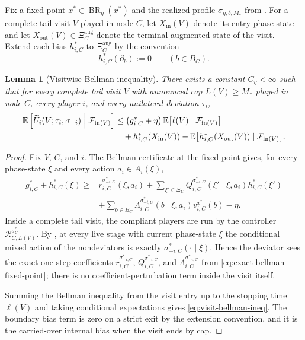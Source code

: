 \documentclass[12pt]{article}
\newtheorem{lemma}[theorem]{Lemma}
\theoremstyle{definition}
\newcommand{\E}{\mathbb{E}}
\newcommand{\1}{\mathbf{1}}
\newcommand{\cF}{\mathcal{F}}
\DeclareMathOperator{\BR}{BR}
\begin{document}
Fix a fixed point $x^*\in\BR_\eta(x^*)$ and the realized profile
$\sigma_{\eta,\delta,M_*}$ from . For a complete tail
visit $V$ played in node $C$, let $X_{\mathrm{in}}(V)$ denote its entry
phase-state and let $X_{\mathrm{out}}(V)\in\Xi_C^{\mathrm{aug}}$ denote the
terminal augmented state of the visit. Extend each bias $h_{i,C}^*$ to
$\Xi_C^{\mathrm{aug}}$ by the convention
\[
h_{i,C}^*(\partial_b):=0
\qquad (b\in B_C).
\]

\begin{lemma}[Visitwise Bellman inequality]
\label{lem:visit-bellman}
There exists a constant $C_\eta<\infty$ such that for every complete tail visit
$V$ with announced cap $L(V)\ge M_*$ played in node $C$, every player $i$, and
every unilateral deviation $\tau_i$,
\begin{equation}
\label{eq:visit-bellman-ineq}
\begin{aligned}
\E\left[
\widetilde U_i(V;\tau_i,\sigma_{-i})
\Bigm|\cF_{\mathrm{in}(V)}
\right]
&\le
\bigl(g_{i,C}^*+\eta\bigr)\,
\E\bigl[\ell(V)\mid\cF_{\mathrm{in}(V)}\bigr]
\\
&\quad+
h_{i,C}^*(X_{\mathrm{in}}(V))
-
\E\bigl[h_{i,C}^*(X_{\mathrm{out}}(V))\mid\cF_{\mathrm{in}(V)}\bigr].
\end{aligned}
\end{equation}
\end{lemma}

\begin{proof}
Fix $V$, $C$, and $i$. The Bellman certificate at the fixed point gives, for
every phase-state $\xi$ and every action $a_i\in A_i(\xi)$,
\begin{align}
\label{eq:exact-bellman-fixed-point}
g_{i,C}^* + h_{i,C}^*(\xi)
\ge {}
&r_{i,C}^{\sigma_{-i,C}^*}(\xi,a_i)
+
\sum_{\xi'\in\Xi_C}Q_{i,C}^{\sigma_{-i,C}^*}(\xi'\mid\xi,a_i)h_{i,C}^*(\xi')
\\
&+
\sum_{b\in B_C}\Lambda_{i,C}^{\sigma_{-i,C}^*}(b\mid\xi,a_i)v_{i,C}^{x^*}(b)
-\eta.
\nonumber
\end{align}
Inside a complete tail visit, the compliant players are run by the controller
$\mathcal R_{C,L(V)}^{\sigma_C^*}$. By , at every live
stage with current phase-state $\xi$ the conditional mixed action of the
nondeviators is exactly $\sigma_{-i,C}^*(\cdot\mid\xi)$. Hence the deviator sees
the exact one-step coefficients
$r_{i,C}^{\sigma_{-i,C}^*}$, $Q_{i,C}^{\sigma_{-i,C}^*}$, and
$\Lambda_{i,C}^{\sigma_{-i,C}^*}$ from
\eqref{eq:exact-bellman-fixed-point}; there is no coefficient-perturbation term
inside the visit itself.

Summing the Bellman inequality from the visit entry up to the stopping time
$\ell(V)$ and taking conditional expectations gives
\eqref{eq:visit-bellman-ineq}. The boundary bias term is zero on a strict exit by
the extension convention, and it is the carried-over internal bias when the visit
ends by cap.
\end{proof}
\end{document}
